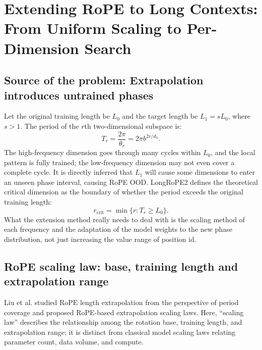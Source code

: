 \documentclass[UTF8,fontset=none,a4paper,10pt]{ctexart}
\begin{document}
\section{Extending RoPE to Long Contexts: From Uniform Scaling to Per-Dimension Search}

\subsection{Source of the problem: Extrapolation introduces untrained phases}

Let the original training length be $L_0$ and the target length be $L_1=sL_0$, where $s>1$. The period of the $r$th two-dimensional subspace is:
\begin{equation}
  T_r=\frac{2\pi}{\theta_r}=2\pi b^{2r/d_h}.
  \label{en:eq:rope-period}
\end{equation}
The high-frequency dimension goes through many cycles within $L_0$, and the local pattern is fully trained; the low-frequency dimension may not even cover a complete cycle. It is directly inferred that $L_1$ will cause some dimensions to enter an unseen phase interval, causing RoPE OOD. LongRoPE2 defines the theoretical critical dimension as the boundary \cite{en:longrope2} of whether the period exceeds the original training length:
\begin{equation}
  r_{\mathrm{crit}}=\min\{r:T_r\ge L_0\}.
  \label{en:eq:critical-dim}
\end{equation}
What the extension method really needs to deal with is the scaling method of each frequency and the adaptation of the model weights to the new phase distribution, not just increasing the value range of position id.

\subsection{RoPE scaling law: base, training length and extrapolation range}

Liu et al. studied RoPE length extrapolation from the perspective of period coverage and proposed RoPE-based extrapolation scaling laws\cite{en:liu2024scalingrope}. Here, ``scaling law'' describes the relationship among the rotation base, training length, and extrapolation range; it is distinct from classical model scaling laws relating parameter count, data volume, and compute.
\end{document}
